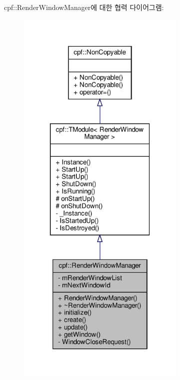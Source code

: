 cpf\+:\+:Render\+Window\+Manager에 대한 협력 다이어그램\+:
\nopagebreak
\begin{figure}[H]
\begin{center}
\leavevmode
\includegraphics[width=229pt]{classcpf_1_1_render_window_manager__coll__graph}
\end{center}
\end{figure}
